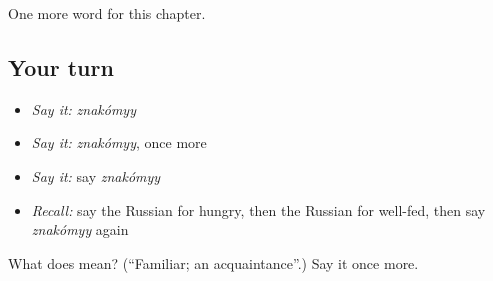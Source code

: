 \begin{grammarlens}[title={What you've built}]
One more word for this chapter.
\end{grammarlens}

\subsection*{Your turn}
\begin{itemize}
\raggedright
  \item \emph{Say it:} \emph{znakómyy}
  \item \emph{Say it:} \emph{znakómyy}, once more
  \item \emph{Say it:} say \emph{znakómyy}
  \item \emph{Recall:} say the Russian for hungry, then the Russian for well-fed, then say \emph{znakómyy} again
\end{itemize}

\begin{tcolorbox}[breakable,colback=teal!4,colframe=teal!35!black,title={Before you move on}]
What does  mean? (\textquotedblleft{}Familiar; an acquaintance\textquotedblright{}.) Say it once more.
\end{tcolorbox}
